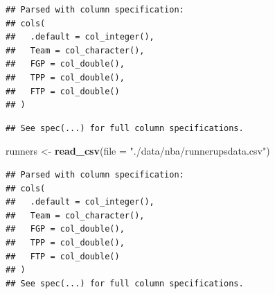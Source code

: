 \documentclass[]{book}
\newenvironment{Shaded}{\begin{snugshade}}{\end{snugshade}}
\newcommand{\CommentTok}[1]{\textcolor[rgb]{0.56,0.35,0.01}{\textit{#1}}}
\newcommand{\DataTypeTok}[1]{\textcolor[rgb]{0.13,0.29,0.53}{#1}}
\newcommand{\KeywordTok}[1]{\textcolor[rgb]{0.13,0.29,0.53}{\textbf{#1}}}
\newcommand{\NormalTok}[1]{#1}
\newcommand{\OperatorTok}[1]{\textcolor[rgb]{0.81,0.36,0.00}{\textbf{#1}}}
\newcommand{\OtherTok}[1]{\textcolor[rgb]{0.56,0.35,0.01}{#1}}
\newcommand{\StringTok}[1]{\textcolor[rgb]{0.31,0.60,0.02}{#1}}
\begin{document}
\begin{Shaded}
\end{Shaded}

\begin{verbatim}
## Parsed with column specification:
## cols(
##   .default = col_integer(),
##   Team = col_character(),
##   FGP = col_double(),
##   TPP = col_double(),
##   FTP = col_double()
## )
\end{verbatim}

\begin{verbatim}
## See spec(...) for full column specifications.
\end{verbatim}

\begin{Shaded}
\begin{Highlighting}[]
\NormalTok{runners <-}\StringTok{ }\KeywordTok{read_csv}\NormalTok{(}\DataTypeTok{file =} \StringTok{"./data/nba/runnerupsdata.csv"}\NormalTok{)}
\end{Highlighting}
\end{Shaded}

\begin{verbatim}
## Parsed with column specification:
## cols(
##   .default = col_integer(),
##   Team = col_character(),
##   FGP = col_double(),
##   TPP = col_double(),
##   FTP = col_double()
## )
## See spec(...) for full column specifications.
\end{verbatim}
\end{document}

